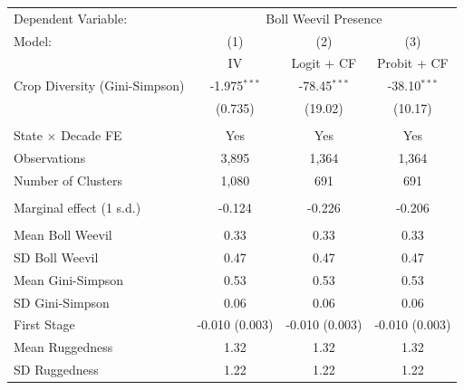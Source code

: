\begin{tabular}{lccc}
 \midrule \midrule
   Dependent Variable: & \multicolumn{3}{c}{Boll Weevil Presence}\\
   Model:                    & (1)            & (2)            & (3)\\  
                             &  IV           & Logit + CF     & Probit + CF\\  
   \midrule
  Crop Diversity (Gini-Simpson) & -1.975$^{***}$ & -78.45$^{***}$ & -38.10$^{***}$ \\
  & (0.735) & (19.02) & (10.17) \\
      &\\
   State $\times$ Decade FE                      & Yes            & Yes            & Yes\\  
 	\midrule
  Observations & 3,895 & 1,364 & 1,364 \\
  Number of Clusters & 1,080 & 691 & 691 \\
    &\\
  Marginal effect (1 s.d.) & -0.124 & -0.226 & -0.206 \\

   &\\  
  Mean Boll Weevil & 0.33 & 0.33 & 0.33 \\
  SD Boll Weevil & 0.47 & 0.47 & 0.47 \\
  Mean Gini-Simpson & 0.53 & 0.53 & 0.53 \\
  SD Gini-Simpson & 0.06 & 0.06 & 0.06 \\
   \midrule
  First Stage & -0.010 (0.003) & -0.010 (0.003) & -0.010 (0.003) \\
  Mean Ruggedness & 1.32 & 1.32 & 1.32 \\
  SD Ruggedness & 1.22 & 1.22 & 1.22 \\
   \midrule \midrule
   
\end{tabular}


